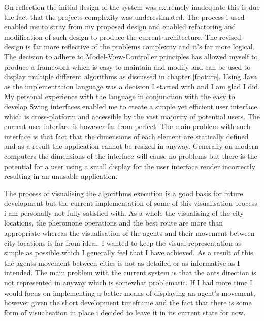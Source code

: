 On reflection the initial design of the system was extremely inadequate this is due the fact that the projects complexity was underestimated. The process i used enabled me to stray from my proposed design and enabled refactoring and modification of such design to produce the current architecture. The revised design is far more reflective of the problems complexity and it’s far more logical. The decision to adhere to Model-View-Controller principles has allowed myself to produce a framework which is easy to maintain and modify and can be used to display multiple different algorithms as discussed in chapter \ref{footure}. Using Java as the implementation language was a decision I started with and I am glad I did. My personal experience with the language in conjunction with the easy to develop Swing interfaces enabled me to create a simple yet efficient user interface which is cross-platform and accessible by the vast majority of potential users. The current user interface is however far from perfect. The main problem with such interface is that fact that the dimensions of each element are statically defined and as a result the application cannot be resized in anyway. Generally on modern computers the dimensions of the interface will cause no problems but there is the potential for a user using a small display for the user interface render incorrectly resulting in an unusable application.

The process of visualising the algorithms execution is a good basis for future development but the current implementation of some of this visualisation process i am personally not fully satisfied with. As a whole the visualising of the city locations, the pheromone operations and the best route are more than appropriate whereas the visualisation of the agents and their movement between city locations is far from ideal. I wanted to keep the visual representation as simple as possible which I generally feel that I have achieved. As a result of this the agents movement between cities is not as detailed or as informative as I intended. The main problem with the current system is that the ants direction is not represented in anyway which is somewhat problematic. If I had more time I would focus on implementing a better means of displaying an agent’s movement, however given the short development timeframe and the fact that there is some form of visualisation in place i decided to leave it in its current state for now.

